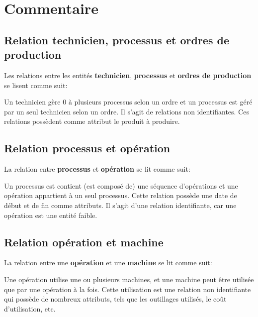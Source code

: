 \documentclass[12pt,letterpaper]{report}
\renewcommand{\b}[1]{\textbf{#1}}
\begin{document}


\newpage

\begin{figure}[h]
  
\end{figure}

\newpage

\chapter{Commentaire}

\section{Relation technicien, processus et ordres de production}

Les relations entre les entités \b{technicien}, \b{processus} et
\b{ordres de production} se lisent comme suit:

Un technicien gère 0 à plusieurs processus selon un ordre et un
processus est géré par un seul technicien selon un ordre.  Il s'agit
de relations non identifiantes.  Ces relations possèdent comme
attribut le produit à produire.


\section{Relation processus et opération}
La relation entre \b{processus} et \b{opération} se lit comme suit:

Un processus est contient (est composé de) une séquence d'opérations
et une opération appartient à un seul processus.  Cette relation
possède une date de début et de fin comme attributs.  Il s'agit d'une
relation identifiante, car une opération est une entité faible.


\section{Relation opération et machine}
La relation entre une \b{opération} et une \b{machine} se lit comme suit:

Une opération utilise une ou plusieurs machines, et une machine peut
être utilisée que par une opération à la fois.  Cette utilisation est
une relation non identifiante qui possède de nombreux attributs, tels
que les outillages utilisés, le coût d'utilisation, etc.
\end{document}
